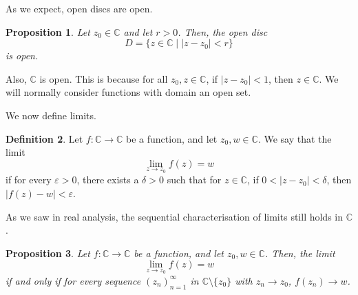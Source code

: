 \documentclass[a4paper, openany]{memoir}
\theoremstyle{definition}
\newtheorem{definition}{Definition}[section]
\theoremstyle{plain}
\newtheorem{proposition}[definition]{Proposition}
\begin{document}
As we expect, open discs are open.
\begin{proposition}
Let $z_0 \in \mathbb{C}$ and let $r > 0$. Then, the open disc
\[D = \{z \in \mathbb{C} \mid |z - z_0| < r\}\]
is open.
\end{proposition}
\noindent Also, $\mathbb{C}$ is open. This is because for all $z_0, z \in \mathbb{C}$, if $|z - z_0| < 1$, then $z \in \mathbb{C}$. We will normally consider functions with domain an open set.

We now define limits.
\begin{definition}
Let $f: \mathbb{C} \to \mathbb{C}$ be a function, and let $z_0, w \in \mathbb{C}$. We say that the limit
\[\lim_{z \to z_0} f(z) = w\]
if for every $\varepsilon > 0$, there exists a $\delta > 0$ such that for $z \in \mathbb{C}$, if $0 < |z - z_0| < \delta$, then $|f(z) - w| < \varepsilon$.
\end{definition}
\noindent As we saw in real analysis, the sequential characterisation of limits still holds in $\mathbb{C}$.
\begin{proposition}
Let $f: \mathbb{C} \to \mathbb{C}$ be a function, and let $z_0, w \in \mathbb{C}$. Then, the limit 
\[\lim_{z \to z_0} f(z) = w\]
if and only if for every sequence $(z_n)_{n=1}^{\infty}$ in $\mathbb{C} \setminus \{z_0\}$ with $z_n \to z_0$, $f(z_n) \to w$.
\end{proposition}
    
\end{document}
